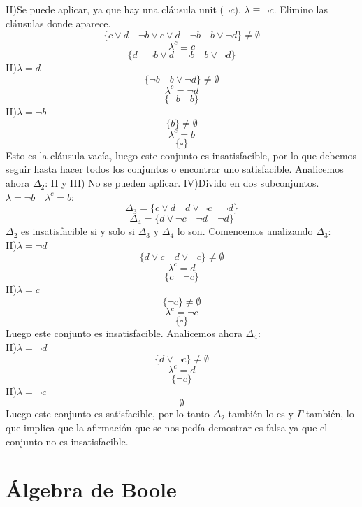 \documentclass[a4paper]{article}
\begin{document}
II)Se puede aplicar, ya que hay una cláusula unit ($\neg c$). $\lambda\equiv\neg c$. Elimino las cláusulas donde aparece.
$$\{ c\lor d\quad\neg b\lor c\lor d\quad\neg b\quad b\lor\neg d \}\neq \emptyset$$
$$\lambda^c\equiv c$$
$$\{d\quad\neg b\lor d\quad\neg b\quad b\lor\neg d\}$$
II)$\lambda=d$
$$\{\neg b\quad b\lor\neg d\}\neq\emptyset$$
$$\lambda^c=\neg d$$
$$\{\neg b\quad b\}$$
II)$\lambda=\neg b$
$$\{b\}\neq\emptyset$$
$$\lambda^c=b$$
$$\{\square\}$$
Esto es la cláusula vacía, luego este conjunto es insatisfacible, por lo que debemos seguir hasta hacer todos los conjuntos o encontrar uno satisfacible. Analicemos ahora $\Delta_2$:
II y III) No se pueden aplicar.
IV)Divido en dos subconjuntos. $\lambda=\neg b \quad \lambda^c=b$:
$$\Delta_3=\{c\lor d\quad d\lor\neg c\quad\neg d\}$$
$$\Delta_4=\{d\lor\neg c\quad\neg d\quad\neg d\}$$
$\Delta_2$ es insatisfacible si y solo si $\Delta_3$ y $\Delta_4$ lo son. Comencemos analizando $\Delta_3$:\\
II)$\lambda=\neg d$
$$\{d\lor c\quad d\lor\neg c\}\neq\emptyset$$
$$\lambda^c=d$$
$$\{c\quad\neg c\}$$
II)$\lambda=c$
$$\{\neg c\}\neq\emptyset$$
$$\lambda^c=\neg c$$
$$\{\square\}$$
Luego este conjunto es insatisfacible. Analicemos ahora $\Delta_4$:\\
II)$\lambda=\neg d$
$$\{d\lor\neg c\}\neq\emptyset$$
$$\lambda^c=d$$
$$\{\neg c\}$$
II)$\lambda=\neg c$
$$\emptyset$$
Luego este conjunto es satisfacible, por lo tanto $\Delta_2$ también lo es y $\Gamma$ también, lo que implica que la afirmación que se nos pedía demostrar es falsa ya que el conjunto no es insatisfacible.

\section{Álgebra de Boole}
\end{document}
